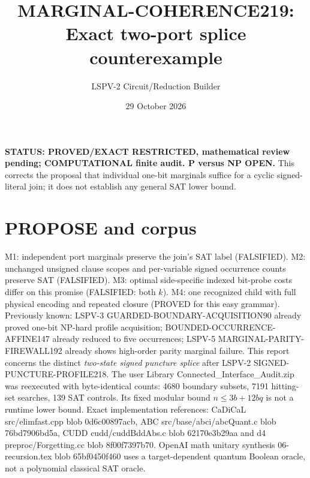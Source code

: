 \documentclass[11pt]{article}
\title{MARGINAL-COHERENCE219: Exact two-port splice counterexample}
\author{LSPV-2 Circuit/Reduction Builder}
\date{29 October 2026}
\begin{document}
\maketitle
\noindent\textbf{STATUS: PROVED/EXACT RESTRICTED, mathematical review pending; COMPUTATIONAL finite audit. P versus NP OPEN.} This corrects the proposal that individual one-bit marginals suffice for a cyclic signed-literal join; it does not establish any general SAT lower bound.
\section{PROPOSE and corpus}
M1: independent port marginals preserve the join's SAT label (FALSIFIED). M2: unchanged unsigned clause scopes and per-variable signed occurrence counts preserve SAT (FALSIFIED). M3: optimal side-specific indexed bit-probe costs differ on this promise (FALSIFIED: both $k$). M4: one recognized child with full physical encoding and repeated closure (PROVED for this easy grammar).
Previously known: LSPV-3 GUARDED-BOUNDARY-ACQUISITION90 already proved one-bit NP-hard profile acquisition; BOUNDED-OCCURRENCE-AFFINE147 already reduced to five occurrences; LSPV-5 MARGINAL-PARITY-FIREWALL192 already shows high-order parity marginal failure. This report concerns the distinct \emph{two-state signed puncture splice} after LSPV-2 SIGNED-PUNCTURE-PROFILE218. The user Library Connected\_Interface\_Audit.zip was reexecuted with byte-identical counts: 4680 boundary subsets, 7191 hitting-set searches, 139 SAT controls. Its fixed modular bound $n\le3b+12bq$ is not a runtime lower bound. Exact implementation references: CaDiCaL src/elimfast.cpp blob 0d6c00897acb, ABC src/base/abci/abcQuant.c blob 76bd7906bd5a, CUDD cudd/cuddBddAbs.c blob 62170e3b29aa and d4 preproc/Forgetting.cc blob 8f00f7397b70. OpenAI math unitary synthesis 06-recursion.tex blob 65bf0450f460 uses a target-dependent quantum Boolean oracle, not a polynomial classical SAT oracle.
\end{document}
